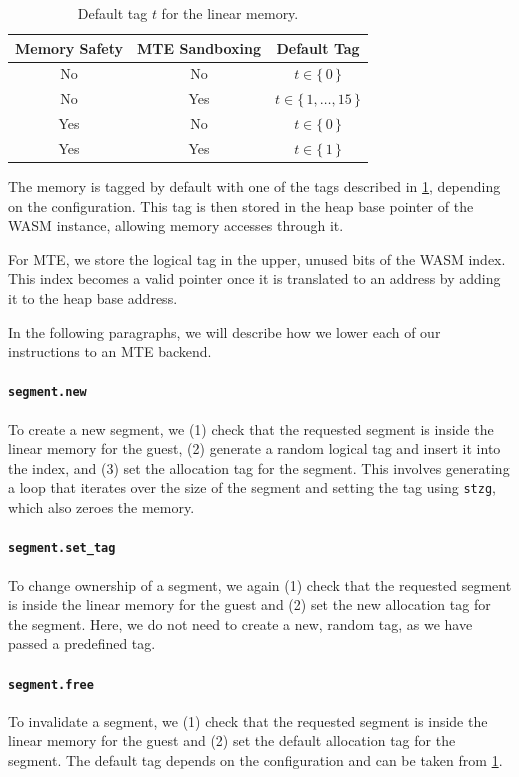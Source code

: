 \begin{table}
  \centering
  \caption{Default tag $t$ for the linear memory.}
  \label{tab:default-tag}
  \begin{tabular}{c | c || c}
    \textbf{Memory Safety} & \textbf{MTE Sandboxing} & \textbf{Default Tag} \\
    \hline
    No  & No  & $t \in \{\,0\,\}$ \\
    No  & Yes & $t \in \{\,1, \dots, 15\,\}$ \\
    Yes & No  & $t \in \{\,0\,\}$ \\
    Yes & Yes & $t \in \{\,1\,\}$
  \end{tabular}
\end{table}

The memory is tagged by default with one of the tags described in \cref{tab:default-tag}, depending on the configuration.
This tag is then stored in the heap base pointer of the \ac{WASM} instance, allowing memory accesses through it.

For \ac{MTE}, we store the logical tag in the upper, unused bits of the \ac{WASM} index.
This index becomes a valid pointer once it is translated to an address by adding it to the heap base address.

In the following paragraphs, we will describe how we lower each of our instructions to an \ac{MTE} backend.

\paragraph{\texttt{segment.new}} To create a new segment, we (1) check that the requested segment is inside the linear memory for the guest, (2) generate a random logical tag and insert it into the index, and (3) set the allocation tag for the segment.
This involves generating a loop that iterates over the size of the segment and setting the tag using \texttt{stzg}, which also zeroes the memory.

\paragraph{\texttt{segment.set\_tag}} To change ownership of a segment, we again (1) check that the requested segment is inside the linear memory for the guest and (2) set the new allocation tag for the segment.
Here, we do not need to create a new, random tag, as we have passed a predefined tag.

\paragraph{\texttt{segment.free}} To invalidate a segment, we (1) check that the requested segment is inside the linear memory for the guest and (2) set the default allocation tag for the segment.
The default tag depends on the configuration and can be taken from \cref{tab:default-tag}.

